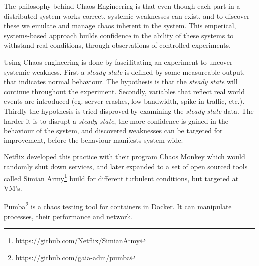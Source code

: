 The philosophy behind Chaos Engineering is that even though each part in a distributed system works correct, systemic weaknesses can exist, and to discover these we emulate and manage chaos inherent in the system. This emperical, systems-based approach builds confidence in the ability of these systems to withstand real conditions, through observations of controlled experiments.

Using Chaos engineering is done by fascillitating an experiment to uncover systemic weakness.
First a \emph{steady state} is defined by some measureable output, that indicates normal behaviour. The hypothesis is that the \emph{steady state} will continue throughout the experiment.
Secondly, variables that reflect real world events are introduced (eg. server crashes, low bandwidth, spike in traffic, etc.).
Thirdly the hypothesis is tried disproved by examining the \emph{steady state} data.
The harder it is to disrupt a \emph{steady state}, the more confidence is gained in the behaviour of the system, and discovered weaknesses can be targeted for improvement, before the behaviour manifests system-wide.

Netflix developed this practice with their program Chaos Monkey which would randomly shut down services, and later expanded to a set of open sourced tools called Simian Army\footnote{\url{https://github.com/Netflix/SimianArmy}} build for different turbulent conditions, but targeted at \acs{VM}'s.

Pumba\footnote{\url{https://github.com/gaia-adm/pumba}} is a chaos testing tool for containers in Docker. It can manipulate processes, their performance and network.


